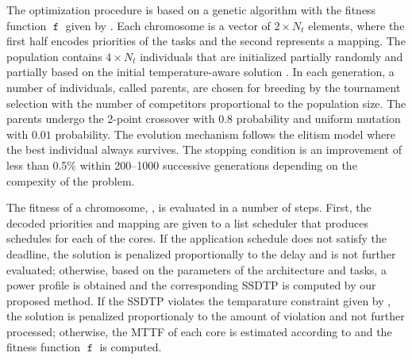 The optimization procedure is based on a genetic algorithm \cite{schmitz2004} with the fitness function $\mttf$ given by . Each chromosome is a vector of $2 \times N_t$ elements, where the first half encodes priorities of the tasks and the second represents a mapping. The population contains $4 \times N_t$ individuals that are initialized partially randomly and partially based on the initial temperature-aware solution \cite{xie2006}. In each generation, a number of individuals, called parents, are chosen for breeding by the tournament selection with the number of competitors proportional to the population size. The parents undergo the 2-point crossover with $0.8$ probability and uniform mutation with $0.01$ probability. The evolution mechanism follows the elitism model where the best individual always survives. The stopping condition is an improvement of less than 0.5\% within 200--1000 successive generations depending on the compexity of the problem.

The fitness of a chromosome, , is evaluated in a number of steps. First, the decoded priorities and mapping are given to a list scheduler that produces schedules for each of the cores. If the application schedule does not satisfy the deadline, the solution is penalized proportionally to the delay and is not further evaluated; otherwise, based on the parameters of the architecture and tasks, a power profile is obtained and the corresponding SSDTP is computed by our proposed method. If the SSDTP violates the temparature constraint given by , the solution is penalized proportionaly to the amount of violation and not further processed; otherwise, the MTTF of each core is estimated according to  and the fitness function $\mttf$ is computed.
